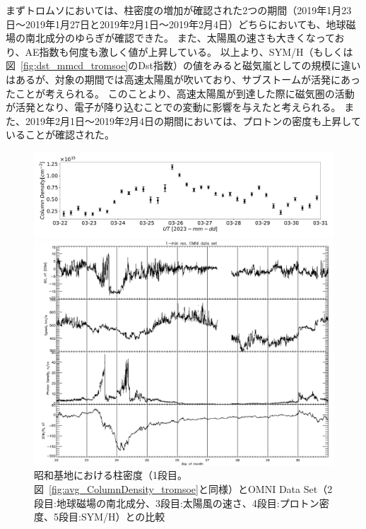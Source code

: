 まずトロムソにおいては、柱密度の増加が確認された2つの期間（2019年1月23日〜2019年1月27日と2019年2月1日〜2019年2月4日）どちらにおいても、地球磁場の南北成分のゆらぎが確認できた。
また、太陽風の速さも大きくなっており、AE指数も何度も激しく値が上昇している。
以上より、SYM/H（もしくは図~\ref{fig:dst_mmcd_tromsoe}のDst指数）の値をみると磁気嵐としての規模に違いはあるが、対象の期間では高速太陽風が吹いており、サブストームが活発にあったことが考えられる。
このことより、高速太陽風が到達した際に磁気圏の活動が活発となり、電子が降り込むことでの変動に影響を与えたと考えられる。
また、2019年2月1日〜2019年2月4日の期間においては、プロトンの密度も上昇していることが確認された。\par
\begin{figure}[htbp]
    \centering
    \begin{minipage}{\linewidth}
        \centering
        \includegraphics[width=\linewidth]{master_thesis_contents/master_thesis_fig/column_density_spectr6_syowa.pdf}
    \end{minipage}
    \begin{minipage}{0.96\linewidth}
        \centering
        \includegraphics[width=\linewidth]{master_thesis_contents/master_thesis_fig/omni_syowa.pdf}
    \end{minipage}
    \caption{昭和基地における柱密度（1段目。図~\ref{fig:avg_ColumnDensity_tromsoe}と同様）とOMNI Data Set（2段目:地球磁場の南北成分、3段目:太陽風の速さ、4段目:プロトン密度、5段目:SYM/H）との比較}
    \label{fig:omni_mmcd_syowa}
\end{figure}

